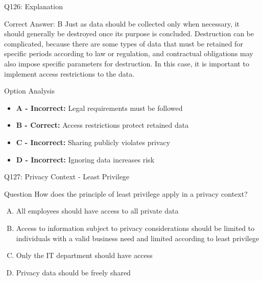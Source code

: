 \documentclass{beamer}
\begin{document}
	\begin{frame}{Q126: Explanation}
		\begin{block}{Correct Answer: B}
			Just as data should be collected only when necessary, it should generally be destroyed once its purpose is concluded. Destruction can be complicated, because there are some types of data that must be retained for specific periods according to law or regulation, and contractual obligations may also impose specific parameters for destruction. In this case, it is important to implement access restrictions to the data.
		\end{block}
		\begin{block}{Option Analysis}
			\begin{itemize}
				\item \textbf{A - Incorrect:} Legal requirements must be followed
				\item \textbf{B - Correct:} Access restrictions protect retained data
				\item \textbf{C - Incorrect:} Sharing publicly violates privacy
				\item \textbf{D - Incorrect:} Ignoring data increases risk
			\end{itemize}
		\end{block}
	\end{frame}
	
	\begin{frame}{Q127: Privacy Context - Least Privilege}
		\begin{block}{Question}
			How does the principle of least privilege apply in a privacy context?
		\end{block}
		\begin{enumerate}[(A)]
			\item All employees should have access to all private data
			\item Access to information subject to privacy considerations should be limited to individuals with a valid business need and limited according to least privilege
			\item Only the IT department should have access
			\item Privacy data should be freely shared
		\end{enumerate}
	\end{frame}
	
\end{document}
